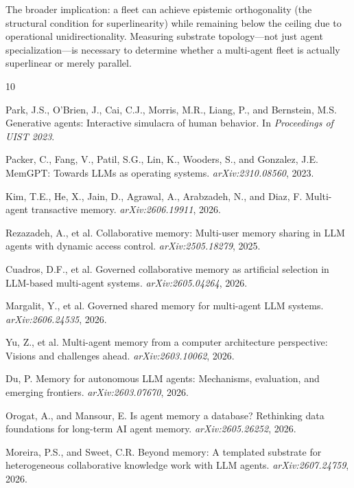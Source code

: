 \documentclass[11pt]{article}
\begin{document}
The broader implication: a fleet can achieve epistemic orthogonality (the
structural condition for superlinearity) while remaining below the ceiling due to
operational unidirectionality. Measuring substrate topology---not just agent
specialization---is necessary to determine whether a multi-agent fleet is
actually superlinear or merely parallel.



\begin{thebibliography}{10}

Park, J.S., O'Brien, J., Cai, C.J., Morris, M.R., Liang, P., and Bernstein, M.S.
\newblock Generative agents: Interactive simulacra of human behavior.
\newblock In \emph{Proceedings of UIST 2023}.

Packer, C., Fang, V., Patil, S.G., Lin, K., Wooders, S., and Gonzalez, J.E.
\newblock MemGPT: Towards LLMs as operating systems.
\newblock \emph{arXiv:2310.08560}, 2023.

Kim, T.E., He, X., Jain, D., Agrawal, A., Arabzadeh, N., and Diaz, F.
\newblock Multi-agent transactive memory.
\newblock \emph{arXiv:2606.19911}, 2026.

Rezazadeh, A., et al.
\newblock Collaborative memory: Multi-user memory sharing in LLM agents with dynamic access control.
\newblock \emph{arXiv:2505.18279}, 2025.

Cuadros, D.F., et al.
\newblock Governed collaborative memory as artificial selection in LLM-based multi-agent systems.
\newblock \emph{arXiv:2605.04264}, 2026.

Margalit, Y., et al.
\newblock Governed shared memory for multi-agent LLM systems.
\newblock \emph{arXiv:2606.24535}, 2026.

Yu, Z., et al.
\newblock Multi-agent memory from a computer architecture perspective: Visions and challenges ahead.
\newblock \emph{arXiv:2603.10062}, 2026.

Du, P.
\newblock Memory for autonomous LLM agents: Mechanisms, evaluation, and emerging frontiers.
\newblock \emph{arXiv:2603.07670}, 2026.

Orogat, A., and Mansour, E.
\newblock Is agent memory a database? Rethinking data foundations for long-term AI agent memory.
\newblock \emph{arXiv:2605.26252}, 2026.

Moreira, P.S., and Sweet, C.R.
\newblock Beyond memory: A templated substrate for heterogeneous collaborative knowledge work with LLM agents.
\newblock \emph{arXiv:2607.24759}, 2026.


\end{thebibliography}
\end{document}
